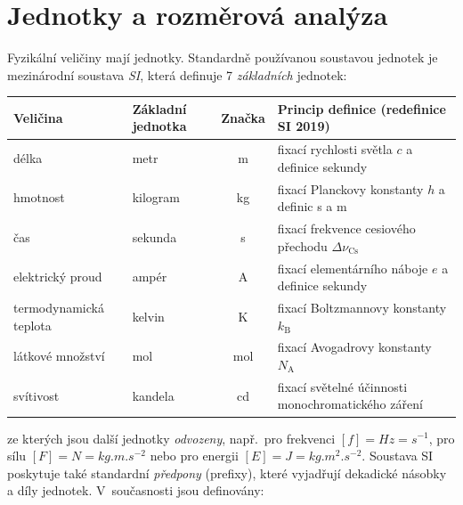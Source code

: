 \section{Jednotky a rozměrová analýza}

Fyzikální veličiny mají jednotky. Standardně používanou soustavou jednotek je mezinárodní soustava \emph{SI}, která definuje 7 \emph{základních} jednotek:
\begin{center}
    \begin{tabular}{llcp{5.8cm}}
        \toprule
        Veličina & Základní jednotka & Značka & Princip definice (redefinice SI 2019) \\ \midrule
        délka & metr & m & fixací rychlosti světla $c$ a definice sekundy \\
        hmotnost & kilogram & kg & fixací Planckovy konstanty $h$ a definic s a m \\
        čas & sekunda & s & fixací frekvence cesiového přechodu $\Delta \nu_{\mathrm{Cs}}$ \\
        elektrický proud & ampér & A & fixací elementárního náboje $e$ a definice sekundy \\
        termodynamická teplota & kelvin & K & fixací Boltzmannovy konstanty $k_\mathrm{B}$ \\
        látkové množství & mol & mol & fixací Avogadrovy konstanty $N_\mathrm{A}$ \\
        svítivost & kandela & cd & fixací světelné účinnosti monochromatického záření \\
        \bottomrule
    \end{tabular}
\end{center}
ze kterých jsou další jednotky \emph{odvozeny}, např.~pro frekvenci $[f] = \unit{Hz} = \unit{s^{-1}}$, pro sílu $[F] = \unit{N} = \unit{kg.m.s^{-2}}$ nebo pro energii $[E] = \unit{J} = \unit{kg.m^2.s^{-2}}$. Soustava SI poskytuje také standardní \emph{předpony} (prefixy), které vyjadřují dekadické násobky a díly jednotek. V~současnosti jsou definovány:
